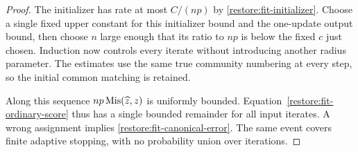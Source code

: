 \begin{proof}
The initializer has rate at most $C/(np)$ by
\cref{restore:fit-initializer}. Choose a single fixed upper constant
for this initializer bound and the one-update output bound, then
choose $n$ large enough that its ratio to $np$ is below the fixed
$c$ just chosen. Induction now controls every iterate without
introducing another radius parameter. The estimates use the same
true community numbering at every step, so the initial common
matching is retained.

Along this sequence $np\operatorname{Mis}(\widehat z,z)$ is uniformly bounded.
Equation~\eqref{restore:fit-ordinary-score} thus has a single bounded
remainder for all input iterates. A wrong assignment implies
\eqref{restore:fit-canonical-error}. The same event covers finite
adaptive stopping, with no probability union over iterations.
\end{proof}
